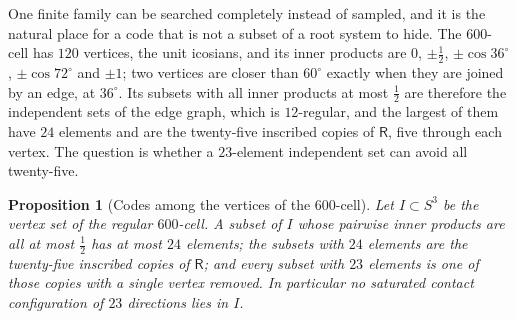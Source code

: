 \documentclass[11pt,reqno]{amsart}
\renewcommand{\_}{\origunderscore\allowbreak}
\numberwithin{equation}{section}
\theoremstyle{plain}
\newtheorem{prop}[thm]{Proposition}
\theoremstyle{definition}
\theoremstyle{remark}
\newcommand{\Rt}{\mathsf{R}}                 %
\begin{document}
One finite family can be searched completely instead of sampled, and it
is the natural place for a code that is not a subset of a root system to
hide. The $600$-cell has $120$ vertices, the unit icosians, and its
inner products are $0$, $\pm\tfrac12$, $\pm\cos36^\circ$,
$\pm\cos72^\circ$ and $\pm1$; two vertices are closer than $60^\circ$
exactly when they are joined by an edge, at $36^\circ$. Its subsets with
all inner products at most $\tfrac12$ are therefore the independent sets
of the edge graph, which is $12$-regular, and the largest of them have
$24$ elements and are the twenty-five inscribed copies of $\Rt$, five
through each vertex. The question is whether a $23$-element independent
set can avoid all twenty-five.

\begin{prop}[Codes among the vertices of the $600$-cell]\label{prop:cell600}
Let $I\subset S^3$ be the vertex set of the regular $600$-cell. A subset
of $I$ whose pairwise inner products are all at most $\tfrac12$ has at
most $24$ elements; the subsets with $24$ elements are the twenty-five
inscribed copies of $\Rt$; and every subset with $23$ elements is one of
those copies with a single vertex removed. In particular no saturated
contact configuration of $23$ directions lies in $I$.
\end{prop}
\end{document}
